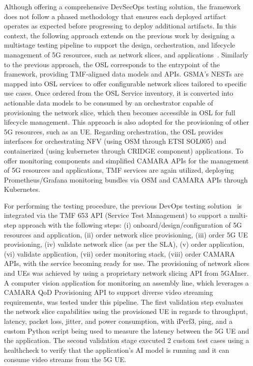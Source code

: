 Although offering a comprehensive DevSecOps testing solution, the framework does not follow a phased methodology that ensures each deployed artifact operates as expected before progressing to deploy additional artifacts. In this context, the following approach extends on the previous work by designing a multistage testing pipeline to support the design, orchestration, and lifecycle management of \acs{5G} resources, such as network slices, and applications~\cite{TMFOpenDigitalArchitecture5GServiceOrchestration}. Similarly to the previous approach, the \acs{OSL} corresponds to the entrypoint of the framework, providing \acs{TMF}-aligned data models and \acsp{API}. \acs{GSMA}'s \acsp{NEST} are mapped into \acs{OSL} services to offer configurable network slices tailored to specific use cases. Once ordered from the \acs{OSL} Service inventory, it is converted  into actionable data models to be consumed by an orchestrator capable of provisioning the network slice, which then becomes accessible in \acs{OSL} for full lifecycle management. This approach is also adopted for the provisioning of other \acs{5G} resources, such as an \acs{UE}. Regarding orchestration, the \acs{OSL} provides interfaces for orchestrating \acs{NFV} (using \acs{OSM} through \acs{ETSI} SOL005) and containerized (using kubernetes through CRIDGE component) applications. To offer monitoring components and simplified CAMARA \acsp{API} for the management of \acs{5G} resources and applications, \acs{TMF} services are again utilized, deploying Prometheus/Grafana monitoring bundles via \acs{OSM} and CAMARA \acsp{API} through Kubernetes.

For performing the testing procedure, the previous DevOps testing solution~\cite{AutomatedTestingOrchestrationFramework} is integrated via the \acs{TMF} 653 \acs{API} (Service Test Management) to support a multi-step approach with the following steps: (i) onboard/design/configuration of \acs{5G} resources and application, (ii) order network slice provisioning, (iii) order \acs{5G} \acs{UE} provisioning, (iv) validate network slice (as per the \acs{SLA}), (v) order application, (vi) validate application, (vii) order monitoring stack, (viii) order CAMARA \acsp{API}, with the service becoming ready for use. The provisioning of network slices and \acsp{UE} was achieved by using a proprietary network slicing \acs{API} from 5GAIner. A computer vision application for monitoring an assembly line, which leverages a CAMARA \acs{QoD} Provisioning \acs{API} to support diverse video streaming requirements, was tested under this pipeline. The first validation step evaluates the network slice capabilities using the provisioned \acs{UE} in regards to throughput, latency, packet loss, jitter, and power consumption, with iPerf3, ping, and a custom Python script being used to measure the latency between the \acs{5G} \acs{UE} and the application. The second validation stage executed 2 custom test cases using a healthcheck to verify that the application's \acs{AI} model is running and it can consume video streams from the \acs{5G} \acs{UE}. 

